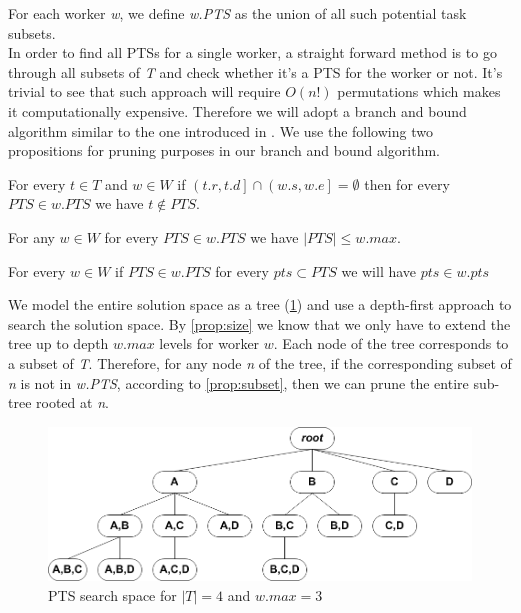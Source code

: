 For each worker \emph{w}, we define \emph{w.PTS} as the union of all such potential task subsets.\\

In order to find all PTSs for a single worker, a straight forward method is to go through all subsets of \emph{T} and check whether it's a PTS for the worker or not. It's trivial to see that such approach will require $O(n!)$ permutations which makes it computationally expensive. Therefore we will adopt a branch and bound algorithm similar to the one introduced in \cite{deng13}. We use the following two propositions for pruning purposes in our branch and bound algorithm.

\begin{proposition}
\label{prop:overlap}
For every $t \in T$ and $w \in W$ if $\left(t.r, t.d \right] \cap \left( w.s, w.e \right] = \emptyset$ then for every $PTS \in w.PTS$ we have $t \not\in PTS$.
\end{proposition}

\begin{proposition}
\label{prop:size}
For any $w \in W$ for every $PTS \in w.PTS$ we have $\left\vert{PTS}\right\vert \leq w.max$.
\end{proposition}

\begin{proposition}
\label{prop:subset}
For every $w \in W$ if $PTS \in w.PTS$ for every $pts \subset PTS$ we will have $pts \in w.pts$
\end{proposition}
We model the entire solution space as a tree (\cref{fig:PTS_tree}) and use a depth-first approach to search the solution space. By \cref{prop:size} we know that we only have to extend the tree up to depth $w.max$ levels for worker $w$. Each node of the tree corresponds to a subset of \emph{T}. Therefore, for any node \emph{n} of the tree, if the corresponding subset of \emph{n} is not in \emph{w.PTS}, according to \cref{prop:subset}, then we can prune the entire sub-tree rooted at \emph{n}.

\begin{figure}[t]
	\centering
	\includegraphics[width = 0.85\columnwidth]{figures/PTS_tree.png}
			\vspace{-0.2cm}
	\caption{PTS search space for $\left\vert T \right\vert = 4$ and $w.max=3$}
	\label{fig:PTS_tree}
			\vspace{-0.2cm}
\end{figure}

